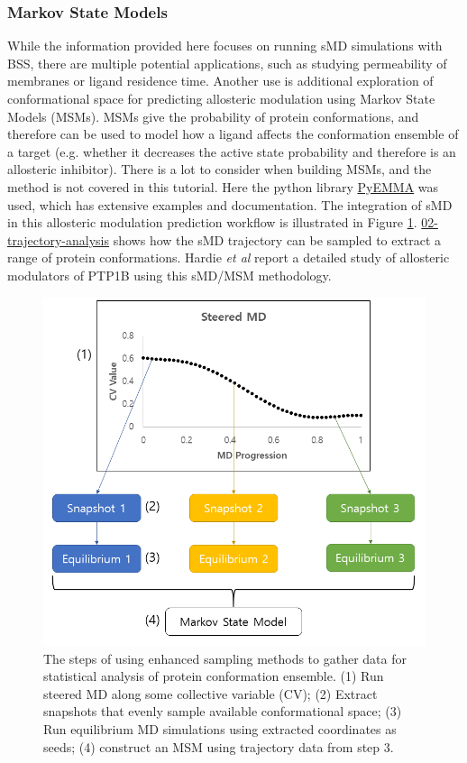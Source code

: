 \subsubsection{Markov State Models}
While the information provided here focuses on running sMD simulations with BSS, there are multiple potential applications, such as studying permeability of membranes\cite{Wells2007} or ligand residence time\cite{Potterton2019}. Another use is additional exploration of conformational space for predicting allosteric modulation using Markov State Models (MSMs). MSMs give the probability of protein conformations, and therefore can be used to model how a ligand affects the conformation ensemble of a target (e.g. whether it decreases the active state probability and therefore is an allosteric inhibitor). There is a lot to consider when building MSMs, and the method is not covered in this tutorial. Here the python library \href{http://emma-project.org/latest/}{PyEMMA} was used, which has extensive examples and documentation\cite{Wehmeyer_2019}. The integration of sMD in this allosteric modulation prediction workflow is illustrated in Figure \ref{fig:ensemble-protocol}. \href{https://github.com/OpenBioSim/BioSimSpaceTutorials/blob/main/03_steered_md/02_trajectory_analysis.ipynb}{02-trajectory-analysis} shows how the sMD trajectory can be sampled to extract a range of protein conformations. Hardie \emph{et al} report a detailed study of allosteric modulators of PTP1B using this sMD/MSM methodology\cite{Hardie2023}.

\begin{figure}[htp]
\includegraphics[width=\linewidth]{LIVECOMS/03_steered_md/ensemble-md-protocol.png}
\caption{The steps of using enhanced sampling methods to gather data for statistical analysis of protein conformation ensemble. (1) Run steered MD along some collective variable (CV); (2) Extract snapshots that evenly sample available conformational space; (3) Run equilibrium MD simulations using extracted coordinates as seeds; (4) construct an MSM using trajectory data from step 3.}
\label{fig:ensemble-protocol}
\end{figure}